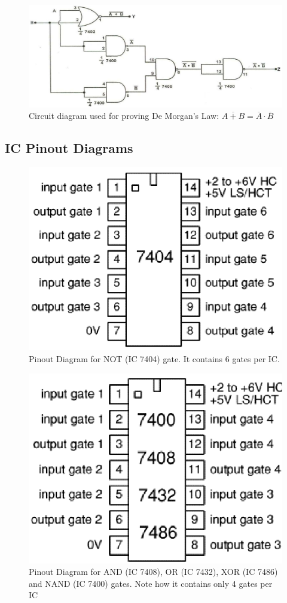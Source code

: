 \begin{figure}[H]
    \centering
    \includegraphics[width=1\columnwidth]{images/or_neg.png}
    \caption{Circuit diagram used for proving De Morgan's Law: ${\overline{A+B} = \overline{A} \cdot \overline {B}}$}
    \label{or_neg}
\end{figure}

\subsection*{IC Pinout Diagrams}

\begin{figure}[H]
    \centering
    \includegraphics[width=0.6\columnwidth]{images/pinout_not.png}
    \caption{Pinout Diagram for NOT (IC 7404) gate. It contains 6 gates per IC.}
    \label{pinout1}
\end{figure}

\begin{figure}[H]
    \centering
    \includegraphics[width=0.6\columnwidth]{images/pinout_and.png}
    \caption{Pinout Diagram for AND (IC 7408), OR (IC 7432), XOR (IC 7486) and NAND (IC 7400) gates. Note how it contains only 4 gates per IC}
    \label{pinout2}
\end{figure}

